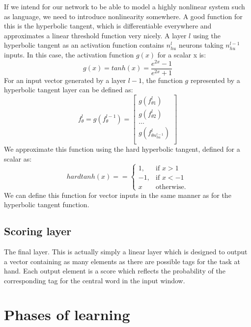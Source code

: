 If we intend for our network to be able to model a highly nonlinear
system such as language, we need to introduce nonlinearity
somewhere. A good function for this is the hyperbolic tangent, which
is differentiable everywhere and approximates a linear threshold
function very nicely. A layer $l$ using the hyperbolic tangent as an
activation function contains $n^l_{hu}$ neurons taking $n^{l-1}_{hu}$
inputs. In this case, the activation function $g(x)$ for a scalar x
is:
\begin{equation}
  g(x) = tanh(x) = \frac{e^{2x} - 1}{e^{2x} + 1}
\end{equation}
For an input vector generated by a layer $l - 1$, the function $g$ represented by a hyperbolic tangent layer can be defined as:
\begin{equation}
  f^l_{\theta} = g(f^{l-1}_{\theta})
  = \left[ \begin{array}{c}
      g(f^l_{\theta1}) \\
      g(f^l_{\theta2}) \\
      \ldots \\
      g(f^l_{\theta n^{l-1}_{hu}})\\ \end{array} \right]
\end{equation}
We approximate this function using the hard hyperbolic tangent, defined for a scalar as:
\begin{equation}
  hardtanh(x) = = \begin{cases} 1, & \mbox{if } x > 1 \\ -1, & \mbox{if } x < -1 \\ x & \mbox{otherwise.}\end{cases}
\end{equation}
We can define this function for vector inputs in the same manner
as for the hyperbolic tangent function.

\subsection{Scoring layer}

The final layer. This is actually simply a linear layer which is
designed to output a vector containing as many elements as there are
possible tags for the task at hand. Each output element is a score
which reflects the probability of the corresponding tag for the
central word in the input window.

\section{Phases of learning}
